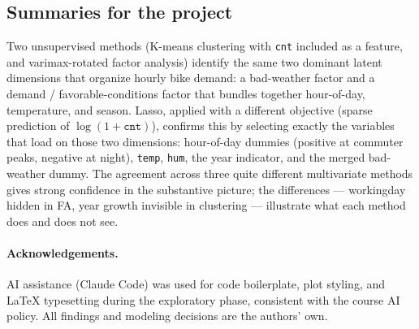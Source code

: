 \documentclass[11pt]{article}
\begin{document}
\subsection*{Summaries for the project}

Two unsupervised methods (K-means clustering with \texttt{cnt}
included as a feature, and varimax-rotated factor analysis)
identify the same two dominant latent dimensions that organize
hourly bike demand: a bad-weather factor and a
demand / favorable-conditions factor that bundles together
hour-of-day, temperature, and season. Lasso, applied with a
different objective (sparse prediction of $\log(1+\texttt{cnt})$),
confirms this by selecting exactly the variables that load on
those two dimensions: hour-of-day dummies (positive at commuter
peaks, negative at night), \texttt{temp}, \texttt{hum}, the year
indicator, and the merged bad-weather dummy. The agreement across
three quite different multivariate methods gives strong confidence
in the substantive picture; the differences --- workingday hidden
in FA, year growth invisible in clustering --- illustrate what
each method does and does not see.

\paragraph{Acknowledgements.}
AI assistance (Claude Code) was used for code boilerplate, plot
styling, and LaTeX typesetting during the exploratory phase,
consistent with the course AI policy. All findings and modeling
decisions are the authors' own.
\end{document}
